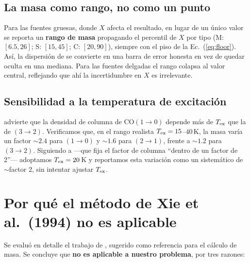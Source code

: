 \documentclass[12pt, a4paper]{article}
\begin{document}
\subsection{La masa como rango, no como un punto}

Para las fuentes gruesas, donde $X$ afecta el resultado, en lugar de un único valor se reporta
un \textbf{rango de masa} propagando el percentil de $X$ por tipo
(M: $[6.5,26]$; S: $[15,45]$; C: $[20,90]$), siempre con el piso de la Ec.~(\ref{eq:floor}).
Así, la dispersión de \citet{ramstedt2014} se convierte en una barra de error honesta en vez
de quedar oculta en una mediana. Para las fuentes delgadas el rango colapsa al valor central,
reflejando que ahí la incertidumbre en $X$ es irrelevante.

\subsection{Sensibilidad a la temperatura de excitación}

\citet{choi1993} advierte que la densidad de columna de CO$(1\to0)$ depende más de $T_{\rm ex}$
que la de $(3\to2)$. Verificamos que, en el rango realista $T_{\rm ex}=15$--$40$\,K, la masa
varía un factor $\sim2.4$ para $(1\to0)$ y $\sim1.6$ para $(2\to1)$, frente a $\sim1.2$ para
$(3\to2)$. Siguiendo a \citet{cerrigone2012} —que fija el factor de columna ``dentro de un
factor de 2''— adoptamos $T_{\rm ex}=20$\,K y reportamos esta variación como un sistemático de
$\sim$factor 2, sin intentar ajustar $T_{\rm ex}$.

\section{Por qué el método de Xie et al.\ (1994) no es aplicable}

Se evaluó en detalle el trabajo de \citet{xie1994}, sugerido como referencia para el cálculo
de masa. Se concluye que \textbf{no es aplicable a nuestro problema}, por tres razones:
\end{document}
